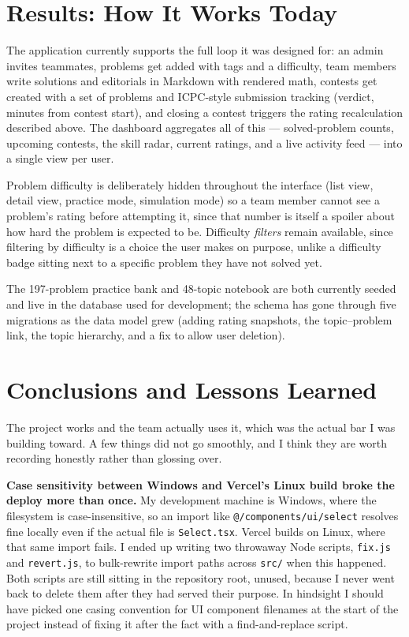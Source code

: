\documentclass[11pt]{article}
\begin{document}
\section{Results: How It Works Today}

The application currently supports the full loop it was designed for: an admin invites teammates, problems get added with tags and a difficulty, team members write solutions and editorials in Markdown with rendered math, contests get created with a set of problems and ICPC-style submission tracking (verdict, minutes from contest start), and closing a contest triggers the rating recalculation described above. The dashboard aggregates all of this --- solved-problem counts, upcoming contests, the skill radar, current ratings, and a live activity feed --- into a single view per user.

Problem difficulty is deliberately hidden throughout the interface (list view, detail view, practice mode, simulation mode) so a team member cannot see a problem's rating before attempting it, since that number is itself a spoiler about how hard the problem is expected to be. Difficulty \emph{filters} remain available, since filtering by difficulty is a choice the user makes on purpose, unlike a difficulty badge sitting next to a specific problem they have not solved yet.

The 197-problem practice bank and 48-topic notebook are both currently seeded and live in the database used for development; the schema has gone through five migrations as the data model grew (adding rating snapshots, the topic--problem link, the topic hierarchy, and a fix to allow user deletion).

\section{Conclusions and Lessons Learned}
\label{sec:lessons}

The project works and the team actually uses it, which was the actual bar I was building toward. A few things did not go smoothly, and I think they are worth recording honestly rather than glossing over.

\textbf{Case sensitivity between Windows and Vercel's Linux build broke the deploy more than once.} My development machine is Windows, where the filesystem is case-insensitive, so an import like \texttt{@/components/ui/select} resolves fine locally even if the actual file is \texttt{Select.tsx}. Vercel builds on Linux, where that same import fails. I ended up writing two throwaway Node scripts, \texttt{fix.js} and \texttt{revert.js}, to bulk-rewrite import paths across \texttt{src/} when this happened. Both scripts are still sitting in the repository root, unused, because I never went back to delete them after they had served their purpose. In hindsight I should have picked one casing convention for UI component filenames at the start of the project instead of fixing it after the fact with a find-and-replace script.
\end{document}
